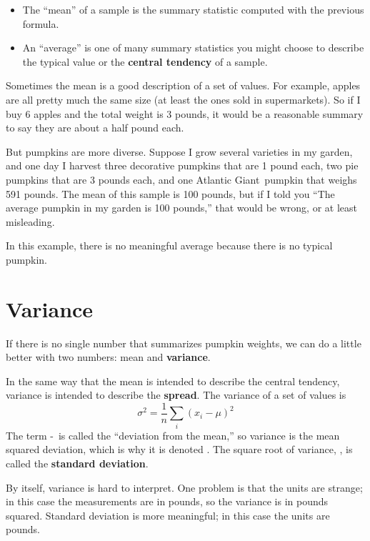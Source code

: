 \documentclass[12pt]{book}
\begin{document}
\begin{itemize}

\item The ``mean'' of a sample is the summary statistic computed with
  the previous formula.

\item An ``average'' is one of many summary statistics you might
  choose to describe the typical value or the
  {\bf central tendency} of a sample.

\end{itemize}

Sometimes the mean is a good description of a set of values.  For
example, apples are all pretty much the same size (at least the ones
sold in supermarkets).  So if I buy 6 apples and the total weight is 3
pounds, it would be a reasonable summary to say they are about a half
pound each.

But pumpkins are more diverse.  Suppose I grow several varieties in my
garden, and one day I harvest three decorative pumpkins that are 1
pound each, two pie pumpkins that are 3 pounds each, and one Atlantic
Giant\textregistered~pumpkin that weighs 591 pounds.  The mean of
this sample is 100 pounds, but if I told you ``The average pumpkin
in my garden is 100 pounds,'' that would be wrong, or at least
misleading.

In this example, there is no meaningful average because
there is no typical pumpkin.

\section{Variance}

If there is no single number that summarizes pumpkin weights,
we can do a little better with two numbers: mean and {\bf variance}.

In the same way that the mean is intended to describe the central
tendency, variance is intended to describe the {\bf spread}.
The variance of a set of values is
%
\[ \sigma^2 = \frac{1}{n} \sum_i (x_i - \mu)^2 \]
%
The term \xsubi-\mymu~is called the ``deviation from the mean,'' so
variance is the mean squared deviation, which is why it is denoted
\sigmasq.  The square root of variance, \mysigma, is called the {\bf
  standard deviation}.

By itself, variance is hard to interpret.  One problem is that the
units are strange; in this case the measurements are in pounds, so the
variance is in pounds squared.  Standard deviation is more meaningful;
in this case the units are pounds.
\end{document}
